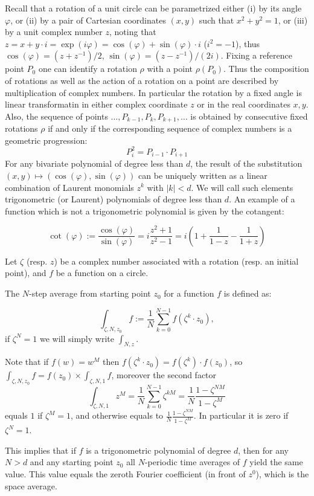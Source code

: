 Recall that a rotation of a unit circle can be parametrized either (i)
by its angle $\varphi$,
or (ii) by a pair of Cartesian coordinates $(x,y)$ such that $x^2+y^2=1$,
or (iii) by a unit complex number $z$, noting that 
$z = x + y \cdot i = \exp(i \varphi) = \cos(\varphi) + \sin(\varphi) \cdot i$
($i^2=-1$),
thus $\cos(\varphi) = (z+z^{-1})/2$, $\sin(\varphi) = (z-z^{-1})/(2i)$.
Fixing a reference point $P_0$ one can identify a rotation $\rho$
with a point $\rho(P_0)$.
Thus the composition of rotations as well as the action of a rotation on a point
are described by multiplication of complex numbers.
In particular the rotation by a fixed angle is linear transformatin
in either complex coordinate $z$ or in the real coordinates $x,y$.
Also, the sequence of points $\dots,P_{k-1},P_k,P_{k+1},\dots$
is obtained by consecutive fixed rotations $ρ$
if and only if the corresponding sequence of complex numbers
is a geometric progression:
\[ P_i^2 = P_{i-1} \cdot P_{i+1} \]
For any bivariate polynomial of degree less than $d$,
the result of the substitution $(x,y) \mapsto (\cos(\varphi),\sin(\varphi))$
can be uniquely written as a linear combination of Laurent monomials $z^k$ with $|k|<d$. We will call
such elements trigonometric (or Laurent) polynomials of degree less than $d$.
An example of a function which is not a trigonometric polynomial
is given by the cotangent:


\[\cot(\varphi) := \frac{\cos(\varphi)}{\sin(\varphi)} 
= i \frac{z^2+1}{z^2-1} = i \left(1+\frac{1}{1-z}-\frac{1}{1+z}\right)\]

Let $ζ$ (resp. $z$) be a complex number associated with a rotation (resp. an initial point),
and $f$ be a function on a circle.

The $N$-step average from starting point $z_0$ for a function $f$ is defined as:

\[ \int_{ζ,N,z_0} f := \frac{1}{N} \sum_{k=0}^{N-1} f(ζ^k \cdot z_0), \]
if $ζ^N = 1$ we will simply write $\int_{N,z}$.

Note that if $f(w) = w^M$ then $f(ζ^k \cdot z_0) = f(ζ^k) \cdot f(z_0)$,
so $\int_{ζ,N,z_0} f = f(z_0) \times \int_{ζ,N,1} f$,
moreover the second factor 
\[ 
\int_{ζ,N,1} z^M 
= \frac{1}{N} \sum_{k=0}^{N-1} ζ^{kM} 
= \frac{1}{N} \frac{1-ζ^{NM}}{1-ζ^M} 
\]
equals $1$ if $ζ^M=1$, 
and otherwise equals to $\frac{1}{N} \frac{1-ζ^{NM}}{1-ζ^M}$. In particular it is zero if $ζ^N=1$.



This implies that if $f$ is a trigonometric polynomial of degree $d$,
then for any $N>d$ and any starting point $z_0$
all $N$-periodic time averages of $f$ yield the same value.
This value equals the zeroth Fourier coefficient (in front of $z^0$),
which is the space average.

